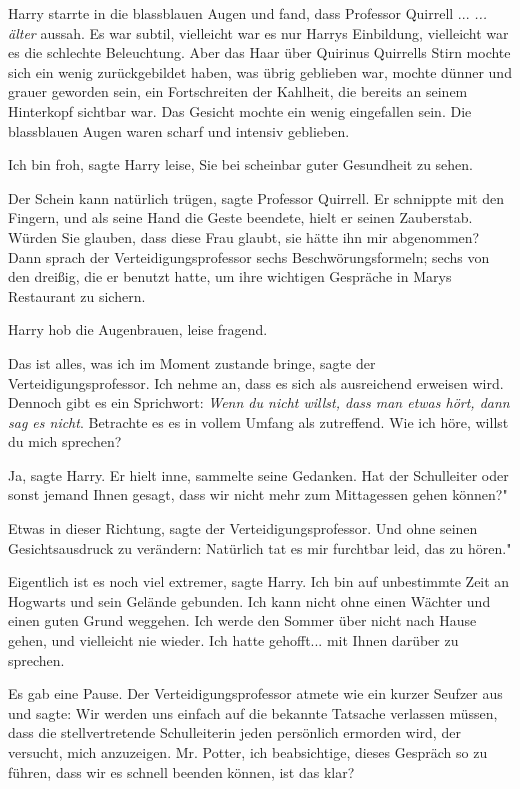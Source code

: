 Harry starrte in die blassblauen Augen und fand, dass Professor Quirrell ...
\emph{... älter} aussah. Es war subtil, vielleicht war es nur Harrys Einbildung,
vielleicht war es die schlechte Beleuchtung. Aber das Haar über Quirinus
Quirrells Stirn mochte sich ein wenig zurückgebildet haben, was übrig geblieben
war, mochte dünner und grauer geworden sein, ein Fortschreiten der Kahlheit, die
bereits an seinem Hinterkopf sichtbar war. Das Gesicht mochte ein wenig
eingefallen sein. Die blassblauen Augen waren scharf und intensiv geblieben.

\glqq{}Ich bin froh\grqq{}, sagte Harry leise, \glqq{}Sie bei scheinbar guter
Gesundheit zu sehen.\grqq{}

\glqq{}Der Schein kann natürlich trügen\grqq{}, sagte Professor Quirrell. Er
schnippte mit den Fingern, und als seine Hand die Geste beendete, hielt er
seinen Zauberstab. \glqq{}Würden Sie glauben, dass diese Frau glaubt, sie hätte
ihn mir abgenommen?\grqq{} Dann sprach der Verteidigungsprofessor sechs
Beschwörungsformeln; sechs von den dreißig, die er benutzt hatte, um ihre
wichtigen Gespräche in Marys Restaurant zu sichern.

Harry hob die Augenbrauen, leise fragend.

\glqq{}Das ist alles, was ich im Moment zustande bringe\grqq{}, sagte der
Verteidigungsprofessor. \glqq{}Ich nehme an, dass es sich als ausreichend
erweisen wird. Dennoch gibt es ein Sprichwort: \emph{Wenn du nicht willst, dass
man etwas hört, dann sag es nicht}. Betrachte es es in vollem Umfang als
zutreffend. Wie ich höre, willst du mich sprechen?\grqq{}

\glqq{}Ja\grqq{}, sagte Harry. Er hielt inne, sammelte seine Gedanken. \glqq{}Hat
der Schulleiter oder sonst jemand Ihnen gesagt, dass wir nicht mehr zum
Mittagessen gehen können?"

\glqq{}Etwas in dieser Richtung\grqq{}, sagte der Verteidigungsprofessor. Und
ohne seinen Gesichtsausdruck zu verändern: \glqq{}Natürlich tat es mir furchtbar
leid, das zu hören."

\glqq{}Eigentlich ist es noch viel extremer\grqq{}, sagte Harry. \glqq{}Ich bin
auf unbestimmte Zeit an Hogwarts und sein Gelände gebunden. Ich kann nicht ohne
einen Wächter und einen guten Grund weggehen. Ich werde den Sommer über nicht
nach Hause gehen, und vielleicht nie wieder. Ich hatte gehofft... mit Ihnen
darüber zu sprechen.\grqq{}

Es gab eine Pause. Der Verteidigungsprofessor atmete wie ein kurzer Seufzer aus
und sagte: \glqq{}Wir werden uns einfach auf die bekannte Tatsache verlassen
müssen, dass die stellvertretende Schulleiterin jeden persönlich ermorden wird,
der versucht, mich anzuzeigen. Mr. Potter, ich beabsichtige, dieses Gespräch so
zu führen, dass wir es schnell beenden können, ist das klar?\grqq{}

